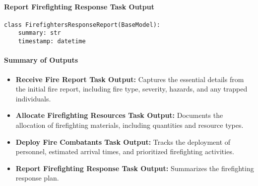 \paragraph{Report Firefighting Response Task Output}
\begin{lstlisting}[caption={Pydantic model for Report Firefighting Response Task Output}]
class FirefightersResponseReport(BaseModel):
    summary: str
    timestamp: datetime
\end{lstlisting}

\paragraph{Summary of Outputs}
\begin{itemize}
\item \textbf{Receive Fire Report Task Output:} Captures the essential details from the initial fire report, including fire type, severity, hazards, and any trapped individuals.
\item \textbf{Allocate Firefighting Resources Task Output:} Documents the allocation of firefighting materials, including quantities and resource types.
\item \textbf{Deploy Fire Combatants Task Output:} Tracks the deployment of personnel, estimated arrival times, and prioritized firefighting activities.
\item \textbf{Report Firefighting Response Task Output:} Summarizes the firefighting response plan.
\end{itemize} 